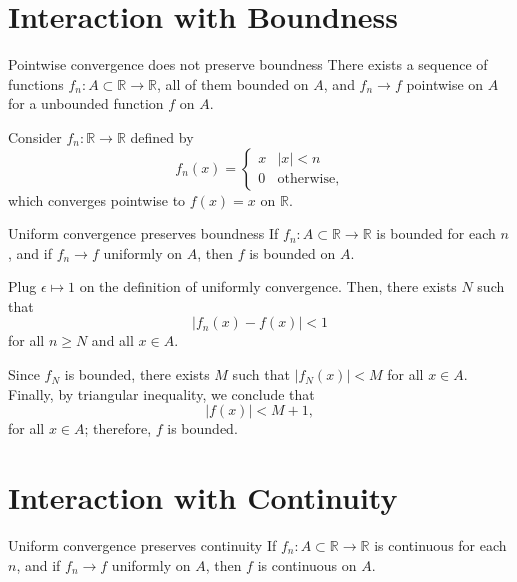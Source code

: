 
\section{Interaction with Boundness}

\begin{prop}{Pointwise convergence does not preserve boundness}{}
  There exists a sequence of functions \(f_n \colon A \subset \mathbb{R} \to \mathbb{R}\), all of them bounded on \(A\), and \(f_n \to f\) pointwise on \(A\) for a unbounded function \(f\) on \(A\).
\end{prop}

\begin{dem}{}{}
  Consider \(f_n \colon \mathbb{R} \to \mathbb{R}\) defined by \[
    f_n(x) = 
	\begin{cases}
	  x & |x| < n \\
	  0 & \text{otherwise,}
	\end{cases}
  \]
  which converges pointwise to \(f(x) = x\) on \(\mathbb{R}\).
\end{dem}

\begin{prop}{Uniform convergence preserves boundness}{}
  If \(f_n \colon A \subset \mathbb{R} \to \mathbb{R}\) is bounded for each \(n\), and if \(f_n \to f\) uniformly on \(A\), then \(f\) is bounded on \(A\).
\end{prop}

\begin{dem}{}{}
  Plug \(\epsilon \mapsto 1\) on the definition of uniformly convergence. Then, there exists \(N\) such that \[
    |f_n(x) - f(x)| < 1
  \] 
  for all \(n \geq N\) and all \(x \in A\).

  Since \(f_N\) is bounded, there exists \(M\) such that \(|f_N(x)| < M\) for all \(x \in A\).
  Finally, by triangular inequality, we conclude that \[
    |f(x)| < M + 1,
  \] 
  for all \(x \in A\); therefore, \(f\) is bounded.
\end{dem}

\section{Interaction with Continuity}

\begin{prop}{Uniform convergence preserves continuity}{}
  If \(f_n \colon A \subset \mathbb{R} \to \mathbb{R}\) is continuous for each \(n\), and if \(f_n \to f\) uniformly on \(A\), then \(f\) is continuous on \(A\).
\end{prop}

